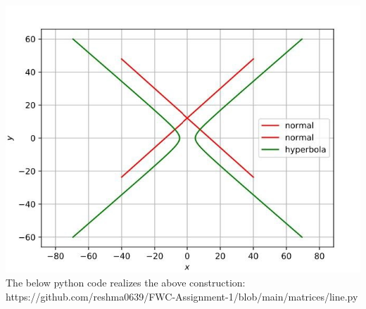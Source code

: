 \documentclass[8pt,a4paper]{report}
\begin{document}
\begin{multicols}{2}
\includegraphics[scale=0.4]{hyp.jpg}
The below python code realizes the above construction:	
\centering     https://github.com/reshma0639/FWC-Assignment-1/blob/main/matrices/line.py
\end{multicols}
\end{document}
